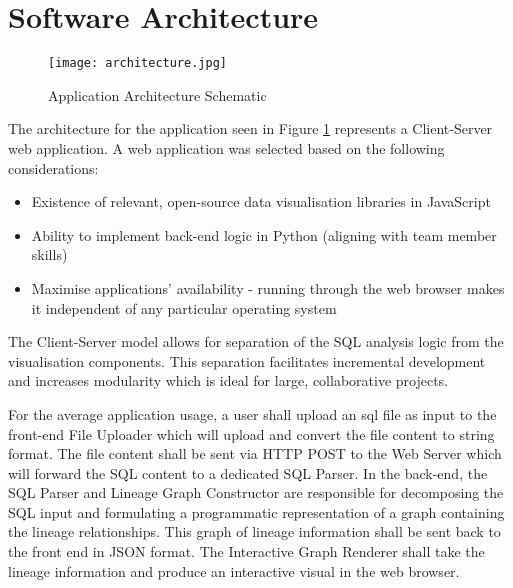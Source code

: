 
\section{Software Architecture}
\begin{spacing}{1.3}

\begin{figure}[h!]
  \caption{Application Architecture Schematic}
  \texttt{[image: architecture.jpg]}
  \label{fig:software-architecture-schematic}
\end{figure}

The architecture for the application seen in Figure \ref{fig:software-architecture-schematic} represents a Client-Server web application. A web application was selected based on the following considerations:

\begin{itemize}
\item Existence of relevant, open-source data visualisation libraries in JavaScript
\item Ability to implement back-end logic in Python (aligning with team member skills)
\item Maximise applications' availability - running through the web browser makes it independent of any particular operating system
\end{itemize}

The Client-Server model allows for separation of the SQL analysis logic from the visualisation components. This separation facilitates incremental development and increases modularity which is ideal for large, collaborative projects.\newline

For the average application usage, a user shall upload an sql file as input to the front-end File Uploader which will upload and convert the file content to string format. The file content shall be sent via HTTP POST to the Web Server which will forward the SQL content to a dedicated SQL Parser. In the back-end, the SQL Parser and Lineage Graph Constructor are responsible for decomposing the SQL input and formulating a programmatic representation of a graph containing the lineage relationships. This graph of lineage information shall be sent back to the front end in JSON format. The Interactive Graph Renderer shall take the lineage information and produce an interactive visual in the web browser. 
\end{spacing}